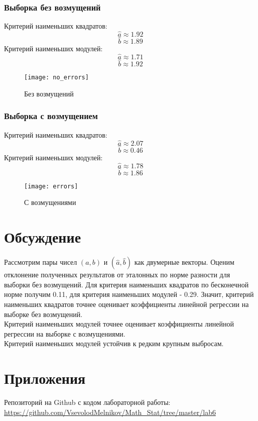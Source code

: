 \subsubsection{Выборка без возмущений}
Критерий наименьших квадратов:
\begin{equation}
\widehat{a}\approx1.92
\end{equation}
\begin{equation}
\widehat{b}\approx1.89
\end{equation}
Критерий наименьших модулей:
\begin{equation}
\widehat{a}\approx1.71
\end{equation}
\begin{equation}
\widehat{b}\approx1.92
\end{equation}
\begin{figure}[!htb]
    \centering
    \texttt{[image: no\_errors]}
    \caption{Без возмущений}
\end{figure}
\newpage
\subsubsection{Выборка с возмущением}
Критерий наименьших квадратов:
\begin{equation}
\widehat{a}\approx2.07
\end{equation}
\begin{equation}
\widehat{b}\approx0.46
\end{equation}
Критерий наименьших модулей:
\begin{equation}
\widehat{a}\approx1.78
\end{equation}
\begin{equation}
\widehat{b}\approx1.86
\end{equation}
\newpage
\begin{figure}[!htb]
    \centering
    \texttt{[image: errors]}
    \caption{С возмущениями}
\end{figure}

\section{Обсуждение}
Рассмотрим пары чисел $(a,b)$ и $(\widehat{a},\widehat{b})$ как двумерные векторы. Оценим отклонение полученных результатов от эталонных по норме разности для выборки без возмущений. Для критерия наименьших квадратов по бесконечной норме получим 0.11, для критерия наименьших модулей - 0.29. Значит, критерий наименьших квадратов точнее оценивает коэффициенты линейной регрессии на выборке без возмущений.\\
Критерий наименьших модулей точнее оценивает коэффициенты линейной регрессии на выборке с возмущениями.\\
Критерий наименьших модулей устойчив к редким крупным выбросам.

\section{Приложения}
Репозиторий на Github с кодом лабораторной работы:\\
\url{https://github.com/VsevolodMelnikov/Math_Stat/tree/master/lab6}

